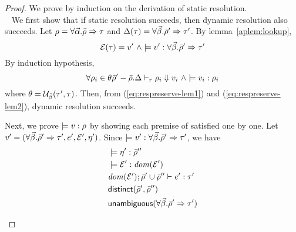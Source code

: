 

\begin{proof} 
  We prove by induction on the derivation of static
  resolution.
  \\
  \case \StaRes~ We first show that if static resolution succeeds,
  then dynamic resolution also succeeds. Let $\rho =
  \forall \vec{\alpha}. \bar{\rho} \Rightarrow \tau$ and $\Delta(\tau) =
  \forall \vec{\beta}. \bar{\rho}' \Rightarrow \tau'$. By lemma~\ref{aplem:lookup},
  \begin{equation}
    \mathcal{E}(\tau) = v' ~\land 
    \models v':\forall \vec{\beta}. \bar{\rho}' \Rightarrow \tau'
    \label{eq:respreserve-lem1}
  \end{equation}
  By induction hypothesis, 
  \begin{equation}
    \forall \rho_i \in \theta \bar{\rho}' - \bar{\rho}.
    \Delta \vdash_{r} \rho_i \Downarrow v_i ~\land 
    \models v_i:\rho_i
    \label{eq:respreserve-lem2}
  \end{equation}
  where $\theta = \mathcal{U}_{\bar{\beta}}(\tau', \tau)$. Then, from
  (\ref{eq:respreserve-lem1}) and (\ref{eq:respreserve-lem2}), dynamic
  resolution succeeds.

  Next, we prove $\models v:\rho$ by showing each
  premise of \TyRClos{} satisfied one by one. Let $v' =
  (\forall \vec{\beta}. \bar{\rho}' \Rightarrow \tau', e', \mathcal{E}',
    \eta')$. Since
  $\models v':\forall \vec{\beta}. \bar{\rho}' \Rightarrow \tau'$, we have
  \begin{align}
    \label{eq:respreserve-lem3}
    & \models \eta':\bar{\rho}'' \\
    \label{eq:respreserve-lem4}
    & \models \mathcal{E}':{\it dom }(\mathcal{E}') \\
    \label{eq:respreserve-lem5}
    & {\it dom }(\mathcal{E}'); \bar{\rho}' \cup \bar{\rho}'' \vdash
    e':\tau' \\
    \label{eq:respreserve-lem6}
    & {\sf distinct}(\bar{\rho}', \bar{\rho}'') \\
    \label{eq:respreserve-lem7}
    & {\sf unambiguous}(\forall \vec{\beta}. \bar{\rho}' \Rightarrow \tau')
  \end{align}
  
  \begin{itemize}


\end{itemize}
\end{proof}

